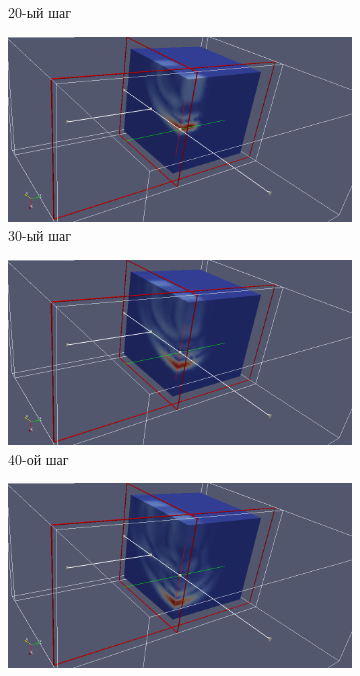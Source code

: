 \begin{figure}[H]
\begin{subfigure}[b]{0.5\textwidth}
\caption{20-ый шаг}
\end{subfigure}
\begin{subfigure}[b]{0.5\textwidth}
\centering
\includegraphics[width=1.0\textwidth]{png/two-graphite-layers/2clip30.png}
\caption{30-ый шаг}
\end{subfigure}
\begin{subfigure}[b]{0.5\textwidth}
\centering
\includegraphics[width=1.0\textwidth]{png/two-graphite-layers/2clip40.png}
\caption{40-ой шаг}
\end{subfigure}
\begin{subfigure}[b]{0.5\textwidth}
\centering
\includegraphics[width=1.0\textwidth]{png/two-graphite-layers/2clip50.png}

\end{subfigure}
\end{figure}
